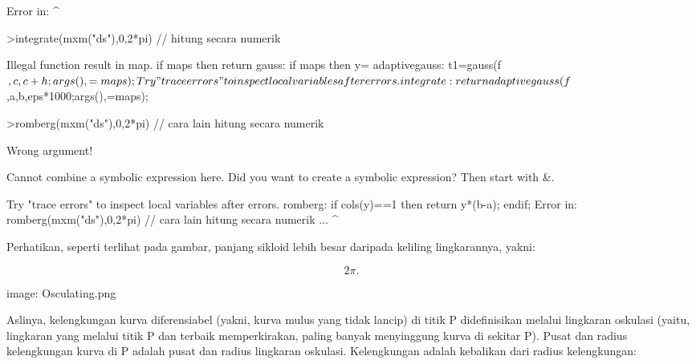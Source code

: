 \documentclass[a4paper,10pt]{article}
\begin{document}
\begin{eulernotebook}
\begin{eulercomment}
\begin{eulercomment}
\begin{eulercomment}
\begin{eulercomment}
\begin{eulercomment}
\begin{eulercomment}
\begin{eulercomment}
\begin{eulercomment}
\begin{eulercomment}
\begin{eulercomment}
\begin{eulercomment}
\begin{eulercomment}
\begin{eulercomment}
\begin{eulercomment}
\begin{eulercomment}
\begin{eulercomment}
\begin{euleroutput}
  Error in:
                                   ^
\end{euleroutput}
\begin{eulerprompt}
>integrate(mxm("ds"),0,2*pi) // hitung secara numerik
\end{eulerprompt}
\begin{euleroutput}
  Illegal function result in map.
      if maps then return %
  gauss:
      if maps then y=%
  adaptivegauss:
      t1=gauss(f$,c,c+h;args(),=maps);
  Try "trace errors" to inspect local variables after errors.
  integrate:
      return adaptivegauss(f$,a,b,eps*1000;args(),=maps);
\end{euleroutput}
\begin{eulerprompt}
>romberg(mxm("ds"),0,2*pi) // cara lain hitung secara numerik
\end{eulerprompt}
\begin{euleroutput}
  Wrong argument!
  
  Cannot combine a symbolic expression here.
  Did you want to create a symbolic expression?
  Then start with &.
  
  Try "trace errors" to inspect local variables after errors.
  romberg:
      if cols(y)==1 then return y*(b-a); endif;
  Error in:
  romberg(mxm("ds"),0,2*pi) // cara lain hitung secara numerik ...
                           ^
\end{euleroutput}
\begin{eulercomment}
Perhatikan, seperti terlihat pada gambar, panjang sikloid lebih besar daripada keliling lingkarannya, yakni:

\end{eulercomment}
\begin{eulerformula}
\[
2\pi.
\]
\end{eulerformula}
\begin{eulercomment}
image: Osculating.png

Aslinya, kelengkungan kurva diferensiabel (yakni, kurva mulus yang tidak lancip) di titik P didefinisikan melalui lingkaran
oskulasi (yaitu, lingkaran yang melalui titik P dan terbaik memperkirakan, paling banyak menyinggung kurva di sekitar P). Pusat
dan radius kelengkungan kurva di P adalah pusat dan radius lingkaran oskulasi. Kelengkungan adalah kebalikan dari radius
kelengkungan:


\end{eulercomment}
\end{eulercomment}
\end{eulercomment}
\end{eulercomment}
\end{eulercomment}
\end{eulercomment}
\end{eulercomment}
\end{eulercomment}
\end{eulercomment}
\end{eulercomment}
\end{eulercomment}
\end{eulercomment}
\end{eulercomment}
\end{eulercomment}
\end{eulercomment}
\end{eulercomment}
\end{eulercomment}
\end{eulernotebook}
\end{document}
